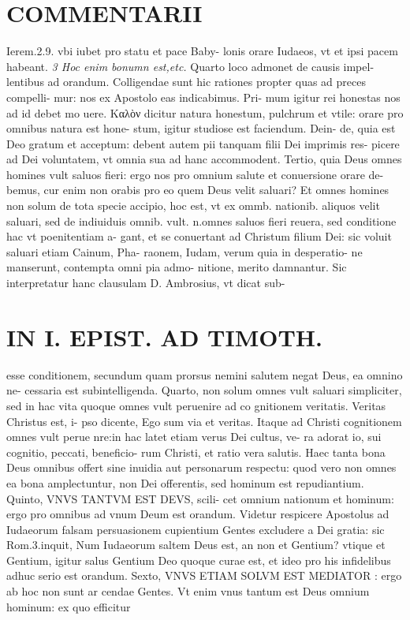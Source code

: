 \documentclass{article}
\begin{document}
\begin{pages}
\section*{COMMENTARII }
\marginpar{[ p.48 ]}\pstart Ierem.2.9. vbi iubet pro statu et pace Baby- lonis orare Iudaeos, vt et ipsi pacem habeant.  \pend
\textit{3 Hoc enim bonumn est,etc. }\pstart Quarto loco admonet de causis impel- lentibus ad orandum. Colligendae sunt hic rationes propter quas ad preces compelli- mur: nos ex Apostolo eas indicabimus. Pri- mum igitur rei honestas nos ad id debet mo uere. Καλὸν dicitur natura honestum, pulchrum et vtile: orare pro omnibus natura est hone- stum, igitur studiose est faciendum. Dein- de, quia est Deo gratum et acceptum: debent autem pii tanquam filii Dei imprimis res- picere ad Dei voluntatem, vt omnia sua ad hanc accommodent. Tertio, quia Deus omnes homines vult saluos fieri: ergo nos pro omnium salute et conuersione orare de- bemus, cur enim non orabis pro eo quem Deus velit saluari? Et omnes homines non solum de tota specie accipio, hoc est, vt ex ommb. nationib. aliquos velit saluari, sed de indiuiduis omnib. vult. n.omnes saluos fieri reuera, sed conditione hac vt poenitentiam a- gant, et se conuertant ad Christum filium Dei: sic voluit saluari etiam Cainum, Pha- raonem, Iudam, verum quia in desperatio- ne manserunt, contempta omni pia admo- nitione, merito damnantur. Sic interpretatur hanc clausulam D. Ambrosius, vt dicat sub-  \pend
\section*{IN I. EPIST. AD TIMOTH. }
\marginpar{[ p.49 ]}\pstart esse conditionem, secundum quam prorsus nemini salutem negat Deus, ea omnino ne- cessaria est subintelligenda. Quarto, non solum omnes vult saluari simpliciter, sed in hac vita quoque omnes vult peruenire ad co gnitionem veritatis. Veritas Christus est, i- pso dicente, Ego sum via et veritas. Itaque ad Christi cognitionem omnes vult perue nre:in hac latet etiam verus Dei cultus, ve- ra adorat io, sui cognitio, peccati, beneficio- rum Christi, et ratio vera salutis. Haec tanta bona Deus omnibus offert sine inuidia aut personarum respectu: quod vero non omnes ea bona amplectuntur, non Dei offerentis, sed hominum est repudiantium.  \pend\pstart Quinto, VNVS TANTVM EST DEVS, scili- cet omnium nationum et hominum: ergo pro omnibus ad vnum Deum est orandum. Videtur respicere Apostolus ad Iudaeorum falsam persuasionem cupientium Gentes excludere a Dei gratia: sic Rom.3.inquit, Num Iudaeorum saltem Deus est, an non et Gentium? vtique et Gentium, igitur salus Gentium Deo quoque curae est, et ideo pro his infidelibus adhuc serio est orandum. Sexto, VNVS ETIAM SOLVM EST MEDIATOR : ergo ab hoc non sunt ar cendae Gentes. Vt enim vnus tantum est Deus omnium hominum: ex quo efficitur  \pend
\marginpar{[ p.50 ]}

\end{pages}
\end{document}
